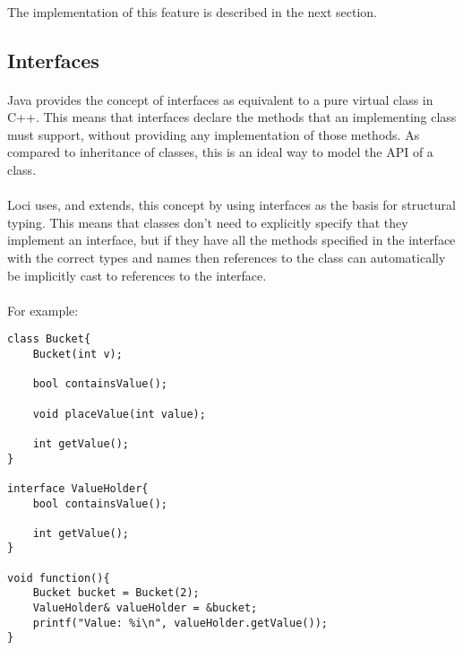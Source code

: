 \documentclass[12pt,twoside,notitlepage]{report}
\begin{document}
\paragraph{}
The implementation of this feature is described in the next section.

\subsection{Interfaces}

\paragraph{}
Java provides the concept of interfaces as equivalent to a pure virtual class in C++. This means that interfaces declare the methods that an implementing class must support, without providing any implementation of those methods. As compared to inheritance of classes, this is an ideal way to model the API of a class.

\paragraph{}
Loci uses, and extends, this concept by using interfaces as the basis for structural typing. This means that classes don't need to explicitly specify that they implement an interface, but if they have all the methods specified in the interface with the correct types and names then references to the class can automatically be implicitly cast to references to the interface.

\paragraph{}
For example:

\small{
\begin{verbatim}
class Bucket{
    Bucket(int v);

    bool containsValue();
    
    void placeValue(int value);
    
    int getValue();
}

interface ValueHolder{
    bool containsValue();
    
    int getValue();
}

void function(){
    Bucket bucket = Bucket(2);
    ValueHolder& valueHolder = &bucket;
    printf("Value: %i\n", valueHolder.getValue());
}
\end{verbatim}
}
\end{document}
